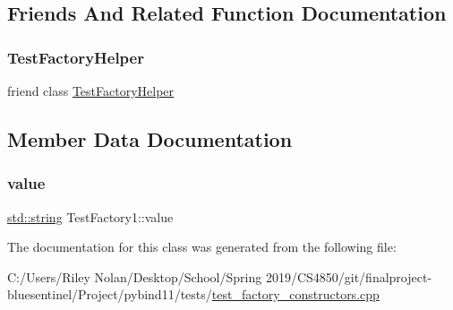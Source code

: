 \subsection{Friends And Related Function Documentation}
\mbox{\label{class_test_factory1_adc15c60543a15213908f8668bd10792b}} 
\subsubsection{\texorpdfstring{TestFactoryHelper}{TestFactoryHelper}}
{\footnotesize\ttfamily friend class \mbox{\hyperlink{class_test_factory_helper}{Test\+Factory\+Helper}}\hspace{0.3cm}{\ttfamily [friend]}}



\subsection{Member Data Documentation}
\mbox{\label{class_test_factory1_a0ab70fa599f629a556a98a47f2a6afc1}} 
\subsubsection{\texorpdfstring{value}{value}}
{\footnotesize\ttfamily \mbox{\hyperlink{_s_d_l__opengl__glext_8h_ab4ccfaa8ab0e1afaae94dc96ef52dde1}{std\+::string}} Test\+Factory1\+::value}



The documentation for this class was generated from the following file\+:\begin{DoxyCompactItemize}
\item 
C\+:/\+Users/\+Riley Nolan/\+Desktop/\+School/\+Spring 2019/\+C\+S4850/git/finalproject-\/bluesentinel/\+Project/pybind11/tests/\mbox{\hyperlink{test__factory__constructors_8cpp}{test\+\_\+factory\+\_\+constructors.\+cpp}}\end{DoxyCompactItemize}
